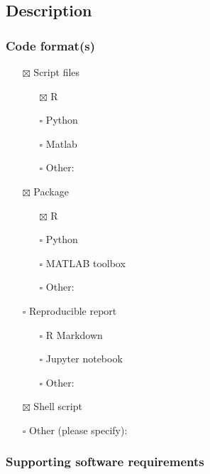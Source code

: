 \documentclass[
]{article}
\providecommand{\tightlist}{%
  \setlength{\itemsep}{0pt}\setlength{\parskip}{0pt}}
\begin{document}
\subsection{Description}\label{description-1}

\subsubsection{Code format(s)}\label{code-formats}

\begin{itemize}
\tightlist
\item[$\boxtimes$]
  Script files

  \begin{itemize}
  \tightlist
  \item[$\boxtimes$]
    R
  \item[$\square$]
    Python
  \item[$\square$]
    Matlab
  \item[$\square$]
    Other:
  \end{itemize}
\item[$\boxtimes$]
  Package

  \begin{itemize}
  \tightlist
  \item[$\boxtimes$]
    R
  \item[$\square$]
    Python
  \item[$\square$]
    MATLAB toolbox
  \item[$\square$]
    Other:
  \end{itemize}
\item[$\square$]
  Reproducible report

  \begin{itemize}
  \tightlist
  \item[$\square$]
    R Markdown
  \item[$\square$]
    Jupyter notebook
  \item[$\square$]
    Other:
  \end{itemize}
\item[$\boxtimes$]
  Shell script
\item[$\square$]
  Other (please specify):
\end{itemize}

\subsubsection{Supporting software
requirements}\label{supporting-software-requirements}
\end{document}

